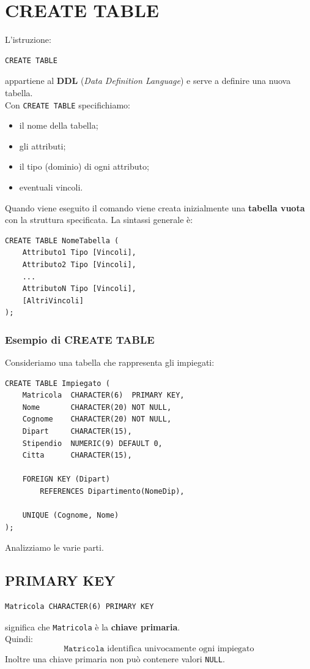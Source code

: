 \section{CREATE TABLE}
L'istruzione:
\begin{verbatim}
CREATE TABLE
\end{verbatim}
\noindent appartiene al \textbf{DDL} (\emph{Data Definition Language}) e serve
a definire una nuova tabella.\\
Con \texttt{CREATE TABLE} specifichiamo:
\begin{itemize}
    \item il nome della tabella;
    \item gli attributi;
    \item il tipo (dominio) di ogni attributo;
    \item eventuali vincoli.
\end{itemize}
\noindent Quando viene eseguito il comando viene creata inizialmente una
\textbf{tabella vuota} con la struttura specificata.
La sintassi generale è:
\begin{verbatim}
CREATE TABLE NomeTabella (
    Attributo1 Tipo [Vincoli],
    Attributo2 Tipo [Vincoli],
    ...
    AttributoN Tipo [Vincoli],
    [AltriVincoli]
);
\end{verbatim}


\subsubsection{Esempio di CREATE TABLE}
Consideriamo una tabella che rappresenta gli impiegati:
\begin{verbatim}
CREATE TABLE Impiegato (
    Matricola  CHARACTER(6)  PRIMARY KEY,
    Nome       CHARACTER(20) NOT NULL,
    Cognome    CHARACTER(20) NOT NULL,
    Dipart     CHARACTER(15),
    Stipendio  NUMERIC(9) DEFAULT 0,
    Citta      CHARACTER(15),

    FOREIGN KEY (Dipart)
        REFERENCES Dipartimento(NomeDip),

    UNIQUE (Cognome, Nome)
);
\end{verbatim}
\noindent Analizziamo le varie parti.

\subsection{PRIMARY KEY}
\begin{verbatim}
Matricola CHARACTER(6) PRIMARY KEY
\end{verbatim}
significa che \texttt{Matricola} è la \textbf{chiave primaria}.\\
Quindi:
\[
\boxed{
\texttt{Matricola} \text{ identifica univocamente ogni impiegato}
}
\]
Inoltre una chiave primaria non può contenere valori \texttt{NULL}.
